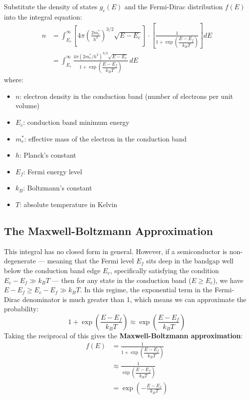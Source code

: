 Substitute the density of states $g_c(E)$ and the Fermi-Dirac distribution $f(E)$ into the integral equation:
\begin{align*}
    n & = \int_{E_c}^{\infty} \left[ 4\pi\!\left(\frac{2m^*_e}{h^2}\right)^{\!3/2}\!\sqrt{E - E_c} \right] \cdot \left[ \frac{1}{1 + \exp\!\left(\dfrac{E - E_f}{k_B T}\right)} \right] dE \\
      & = \int_{E_c}^{\infty} \frac{4\pi(2m^*_e/h^2)^{3/2}\sqrt{E - E_c}}{1 + \exp\!\left(\dfrac{E - E_f}{k_B T}\right)}\, dE
\end{align*}
where:
\begin{itemize}
    \item $n$: electron density in the conduction band (number of electrons per unit volume)
    \item $E_c$: conduction band minimum energy
    \item $m^*_e$: effective mass of the electron in the conduction band
    \item $h$: Planck's constant
    \item $E_f$: Fermi energy level
    \item $k_B$: Boltzmann's constant
    \item $T$: absolute temperature in Kelvin
\end{itemize}

\subsection{The Maxwell-Boltzmann Approximation}

This integral has no closed form in general. However, if a semiconductor is non-degenerate — meaning that the Fermi level $E_f$ sits deep in the bandgap well below the conduction band edge $E_c$, specifically satisfying the condition $E_c - E_f \gg k_B T$ — then for any state in the conduction band ($E \geq E_c$), we have $E - E_f \geq E_c - E_f \gg k_B T$. In this regime, the exponential term in the Fermi-Dirac denominator is much greater than 1, which means we can approximate the probability:
\begin{equation*}
    1 + \exp\!\left(\frac{E - E_f}{k_B T}\right) \approx \exp\!\left(\frac{E - E_f}{k_B T}\right)
\end{equation*}
Taking the reciprocal of this gives the \textbf{Maxwell-Boltzmann approximation}:
\begin{align*}
    f(E) & = \frac{1}{1 + \exp\!\left(\dfrac{E - E_f}{k_B T}\right)}   \\
         & \approx \frac{1}{\exp\!\left(\dfrac{E - E_f}{k_B T}\right)} \\
         & = \exp\!\left(-\frac{E - E_f}{k_B T}\right)
\end{align*}

